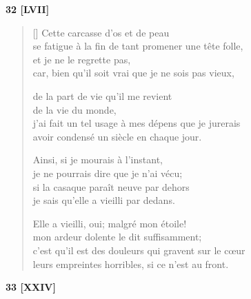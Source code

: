 \documentclass[a4paper,12pt]{book}
\begin{document}
\begin{center}
  \textbf{32 [LVII]}
\end{center}

\settowidth{\versewidth}{horribles gravent sur le cœur, si ce n'est au front.}

\begin{verse}[\versewidth]
  Cette carcasse d'os et de peau \\
  se fatigue à la fin de tant promener une tête folle, \\
  et je ne le regrette pas, \\
  car, bien qu'il soit vrai que je ne sois pas vieux,

  de la part de vie qu'il me revient \\
  de la vie du monde, \\
  j'ai fait un tel usage à mes dépens que je jurerais \\
  avoir condensé un siècle en chaque jour.

  Ainsi, si je mourais à l'instant, \\
  je ne pourrais dire que je n'ai vécu; \\
  si la casaque paraît neuve par dehors \\
  je sais qu'elle a vieilli par dedans.

  Elle a vieilli, oui; malgré mon étoile! \\
  mon ardeur dolente le dit suffisamment; \\
  c'est qu'il est des douleurs qui gravent sur le cœur \\
  leurs empreintes horribles, si ce n'est au front.
\end{verse}

\bigskip

\begin{center}
  \textbf{33 [XXIV]}
\end{center}

\settowidth{\versewidth}{deux baisers qui à l'unisson éclatent,}
\end{document}
